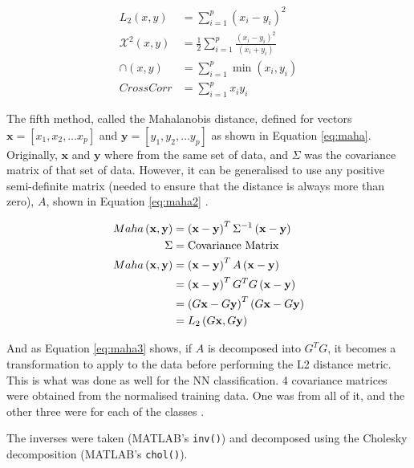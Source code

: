 \documentclass[a4paper, 10pt, conference]{ieeeconf}
\begin{document}
\begin{align}
  L_2 \left( x, y \right) &= \sum_{i = 1}^{p} \left( x_i  - y_i \right) ^2 \label{eq:l22}\\
  \mathcal{X}^2 \left( x, y \right) &= \frac{1}{2} \sum_{i = 1}^{p} \frac{\left( x_i - y_i \right) ^2 }{\left( x_i + y_i \right)} \label{eq:chi}\\
  \cap \left( x, y \right) &= \sum_{i = 1}^{p} \min \left( x_i, y_i \right) \label{eq:intersection}\\
  CrossCorr &= \sum_{i = 1}^{p} x_i y_i \label{eq:corr}
\end{align}

The fifth method, called the Mahalanobis distance, defined for vectors $\mathbf{x} = [x_1, x_2, \ldots x_p]$ and $\mathbf{y} = [y_1, y_2, \ldots y_p]$ as shown in Equation \ref{eq:maha}. Originally, $\mathbf{x}$ and $\mathbf{y}$ where from the same set of data, and $\Sigma$ was the covariance matrix of that set of data. However, it can be generalised to use any positive semi-definite matrix (needed to ensure that the distance is always more than zero), $A$, shown in Equation \ref{eq:maha2} \cite{metrics}.

\begin{align}
  Maha \left( \mathbf{x}, \mathbf{y} \right) &= \left( \mathbf{x} - \mathbf{y} \right) ^T \Sigma^{-1} \left( \mathbf{x} - \mathbf{y} \right)\label{eq:maha}\\
  \Sigma &= \text{Covariance Matrix}\notag\\
  Maha \left( \mathbf{x}, \mathbf{y} \right)&= \left( \mathbf{x} - \mathbf{y} \right) ^T A \left( \mathbf{x} - \mathbf{y}\right)\label{eq:maha2}\\
  &= \left( \mathbf{x} - \mathbf{y} \right) ^T G^T G \left( \mathbf{x} - \mathbf{y}\right)\notag\\
  &= \left( G\mathbf{x} - G\mathbf{y} \right) ^T \left( G\mathbf{x} - G\mathbf{y}\right)\notag\\
  &= L_2\left( G\mathbf{x}, G\mathbf{y} \right) \label{eq:maha3}
\end{align}

And as Equation \ref{eq:maha3} shows, if $A$ is decomposed into $G^TG$, it becomes a transformation to apply to the data before performing the L2 distance metric. This is what was done as well for the NN classification. 4 covariance matrices were obtained from the normalised training data. One was from all of it, and the other three were for each of the classes \cite{metrics}.

The inverses were taken (MATLAB's \texttt{inv()}) and decomposed using the Cholesky decomposition (MATLAB's \texttt{chol()}).
\end{document}
